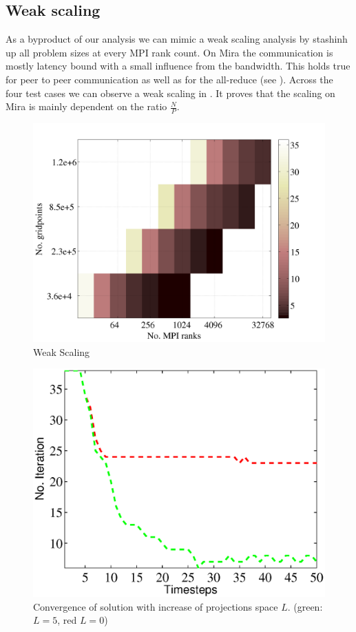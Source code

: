 \documentclass{sig-alternate}
\begin{document}
\subsection{Weak scaling}
As a byproduct of our analysis we can mimic a weak scaling analysis by stashinh up all problem sizes at every MPI rank count. On Mira the communication is mostly latency bound with a small influence from the
bandwidth. This holds true for peer to peer communication as well as for the
all-reduce (see ). Across the four test cases we can observe a weak scaling in
. It proves that the scaling on Mira is mainly dependent on the ratio $\frac{N}{P}$. 
\begin{figure}
  \centering
  \includegraphics[width=\linewidth]{./figures/weak.png}
  \caption{Weak Scaling}
  \label{fig:weakscaling}
\end{figure}

\begin{figure}
  \centering
  \includegraphics[width=\linewidth]{./figures/projections.eps}
  \caption{Convergence of solution with increase of projections space $L$. (green: $L=5$, red $L=0$) }
  \label{fig:projections}
\end{figure}
\end{document}
